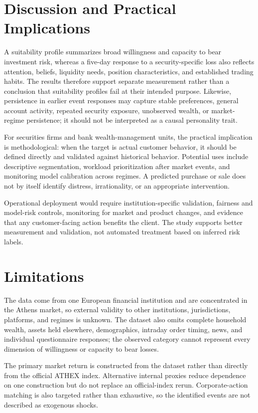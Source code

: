 \documentclass[conference]{IEEEtran}
\begin{document}
\section{Discussion and Practical Implications}
A suitability profile summarizes broad willingness and capacity to bear investment risk, whereas a five-day response to a security-specific loss also reflects attention, beliefs, liquidity needs, position characteristics, and established trading habits. The results therefore support separate measurement rather than a conclusion that suitability profiles fail at their intended purpose. Likewise, persistence in earlier event responses may capture stable preferences, general account activity, repeated security exposure, unobserved wealth, or market-regime persistence; it should not be interpreted as a causal personality trait.

For securities firms and bank wealth-management units, the practical implication is methodological: when the target is actual customer behavior, it should be defined directly and validated against historical behavior. Potential uses include descriptive segmentation, workload prioritization after market events, and monitoring model calibration across regimes. A predicted purchase or sale does not by itself identify distress, irrationality, or an appropriate intervention.

Operational deployment would require institution-specific validation, fairness and model-risk controls, monitoring for market and product changes, and evidence that any customer-facing action benefits the client. The study supports better measurement and validation, not automated treatment based on inferred risk labels.

\section{Limitations}
The data come from one European financial institution and are concentrated in the Athens market, so external validity to other institutions, jurisdictions, platforms, and regimes is unknown. The dataset also omits complete household wealth, assets held elsewhere, demographics, intraday order timing, news, and individual questionnaire responses; the observed category cannot represent every dimension of willingness or capacity to bear losses.

The primary market return is constructed from the dataset rather than directly from the official ATHEX index. Alternative internal proxies reduce dependence on one construction but do not replace an official-index rerun. Corporate-action matching is also targeted rather than exhaustive, so the identified events are not described as exogenous shocks.
\end{document}
